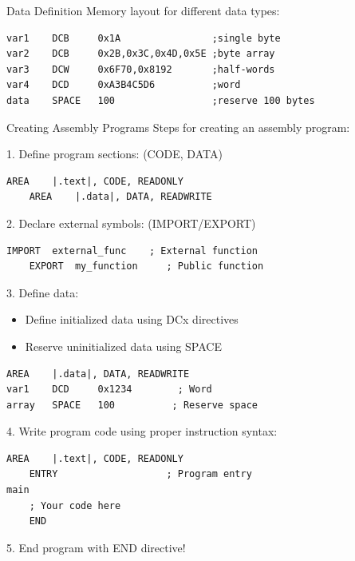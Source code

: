 \begin{code}{Data Definition}
Memory layout for different data types:
\begin{lstlisting}[language=armasm, style=basesmol]
var1    DCB     0x1A                ;single byte
var2    DCB     0x2B,0x3C,0x4D,0x5E ;byte array
var3    DCW     0x6F70,0x8192       ;half-words
var4    DCD     0xA3B4C5D6          ;word
data    SPACE   100                 ;reserve 100 bytes
\end{lstlisting}
\end{code}

\begin{KR}{Creating Assembly Programs}
Steps for creating an assembly program:

1. Define program sections: (CODE, DATA)
\begin{lstlisting}[language=armasm, style=basesmol]
    AREA    |.text|, CODE, READONLY
    AREA    |.data|, DATA, READWRITE
\end{lstlisting}

2. Declare external symbols: (IMPORT/EXPORT)
\begin{lstlisting}[language=armasm, style=basesmol]
    IMPORT  external_func    ; External function
    EXPORT  my_function     ; Public function
\end{lstlisting}

3. Define data:
\begin{itemize}
  \item Define initialized data using DCx directives
  \item Reserve uninitialized data using SPACE
\end{itemize}
\begin{lstlisting}[language=armasm, style=basesmol]
    AREA    |.data|, DATA, READWRITE
var1    DCD     0x1234        ; Word
array   SPACE   100          ; Reserve space
\end{lstlisting}

4. Write program code using proper instruction syntax:
\begin{lstlisting}[language=armasm, style=basesmol]
    AREA    |.text|, CODE, READONLY
    ENTRY                   ; Program entry
main
    ; Your code here
    END
\end{lstlisting}

5. End program with END directive!
\end{KR}





